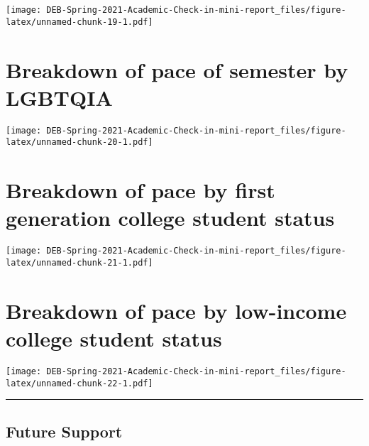 \documentclass[
]{article}
\begin{document}
\texttt{[image: DEB-Spring-2021-Academic-Check-in-mini-report\_files/figure-latex/unnamed-chunk-19-1.pdf]}

\hypertarget{breakdown-of-pace-of-semester-by-lgbtqia}{%
\section{Breakdown of pace of semester by
LGBTQIA}\label{breakdown-of-pace-of-semester-by-lgbtqia}}

\texttt{[image: DEB-Spring-2021-Academic-Check-in-mini-report\_files/figure-latex/unnamed-chunk-20-1.pdf]}

\hypertarget{breakdown-of-pace-by-first-generation-college-student-status}{%
\section{Breakdown of pace by first generation college student
status}\label{breakdown-of-pace-by-first-generation-college-student-status}}

\texttt{[image: DEB-Spring-2021-Academic-Check-in-mini-report\_files/figure-latex/unnamed-chunk-21-1.pdf]}

\hypertarget{breakdown-of-pace-by-low-income-college-student-status}{%
\section{Breakdown of pace by low-income college student
status}\label{breakdown-of-pace-by-low-income-college-student-status}}

\texttt{[image: DEB-Spring-2021-Academic-Check-in-mini-report\_files/figure-latex/unnamed-chunk-22-1.pdf]}

\begin{center}\rule{0.5\linewidth}{0.5pt}\end{center}

\hypertarget{future-support}{%
\subsection{Future Support}\label{future-support}}
\end{document}
